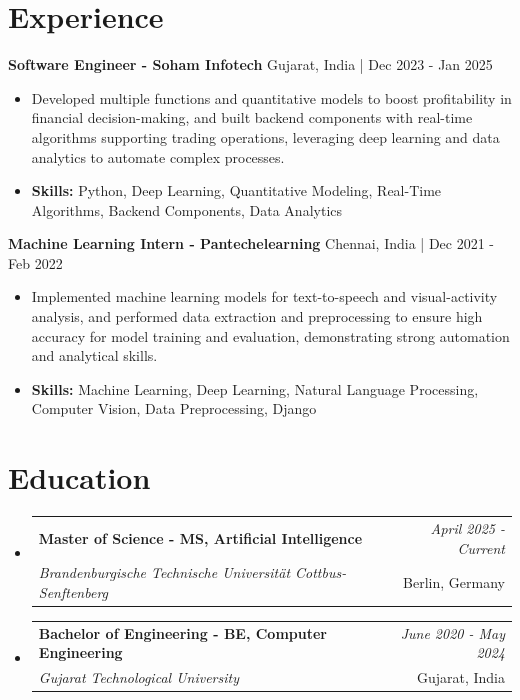 \documentclass[a4paper,11pt]{article}
\makeatletter
\newcommand{\resumeSubheading}[4]{
\vspace{0.5mm}\item
    \begin{tabular*}{\linewidth}[t]{l@{\extracolsep{\fill}}r}
        \textbf{#1} & \textit{\footnotesize{#4}} \\
        \textit{\footnotesize{#3}} &  \footnotesize{#2}\\
    \end{tabular*}
    \vspace{-2.4mm}
}
\makeatother
\begin{document}
\section{\textbf{Experience}}


\vspace{1mm}
  \textbf{Software Engineer - Soham Infotech} \hfill Gujarat, India | Dec 2023 - Jan 2025
\vspace{-1.5mm} %
\begin{itemize}
  \item Developed multiple functions and quantitative models to boost profitability in financial decision-making, and built backend components with real-time algorithms supporting trading operations, leveraging deep learning and data analytics to automate complex processes.

\vspace{-2mm}
  \item \textbf{Skills:} Python, Deep Learning, Quantitative Modeling, Real-Time Algorithms, Backend Components, Data Analytics
\end{itemize}

\vspace{1mm}
  \textbf{Machine Learning Intern - Pantechelearning} \hfill Chennai, India | Dec 2021 - Feb 2022
\vspace{-1.5mm} %
\begin{itemize}
  \item Implemented machine learning models for text-to-speech and visual-activity analysis, and performed data extraction and preprocessing to ensure high accuracy for model training and evaluation, demonstrating strong automation and analytical skills.
\vspace{-2mm}
  \item \textbf{Skills:} Machine Learning, Deep Learning, Natural Language Processing, Computer Vision, Data Preprocessing, Django
\end{itemize}\section{\textbf{Education}}
\vspace{-0.4mm}

\begin{itemize}[leftmargin=0.15in, label={}]
\resumeSubheading
{Master of Science - MS, Artificial Intelligence }{Berlin, Germany}
{Brandenburgische Technische Universität Cottbus-Senftenberg  }{April 2025 - Current}

\vspace{1.0mm} %
\resumeSubheading
{Bachelor of Engineering - BE, Computer Engineering  }{Gujarat, India}
{Gujarat Technological University }{June 2020 - May 2024}

\end{itemize}
\end{document}
